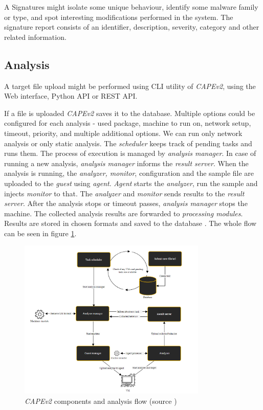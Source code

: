 A Signatures might isolate some unique behaviour, identify some malware family or type, and spot interesting modifications performed in the system. The signature report consists of an identifier, description, severity, category and other related information.

\subsection{Analysis}
A target file upload might be performed using CLI utility of \emph{CAPEv2}, using the Web interface,  Python API or REST API.

If a file is uploaded \emph{CAPEv2} saves it to the database. Multiple options could be configured for each analysis - used package, machine to run on, network setup, timeout, priority, and multiple additional options. We can run only network analysis or only static analysis. The \emph{scheduler} keeps track of pending tasks and runs them. The process of execution is managed by \emph{analysis manager}. In case of running a new analysis, \emph{analysis manager} informs the \emph{result server}. When the analysis is running, the \emph{analyzer, monitor}, configuration and the sample file are uploaded to the \emph{guest} using \emph{agent}. \emph{Agent} starts the \emph{analyzer}, run the sample and injects \emph{monitor} to that. The \emph{analyzer} and \emph{monitor} sends results to the \emph{result server}. After the analysis stops or timeout passes, \emph{analysis manager} stops the machine. The collected analysis results are forwarded to \emph{processing modules}. Results are stored in chosen formats and saved to the database \cite{CuckooSa10:online}. The whole flow can be seen in figure \ref{fig:capeflow}.

\begin{figure}[h]
  \centering
  \includegraphics[width=0.8\textwidth]{figures/flow.png}
  \caption{\emph{CAPEv2} components and analysis flow (source \cite{CuckooSa10:online})}
  \label{fig:capeflow}
\end{figure}


